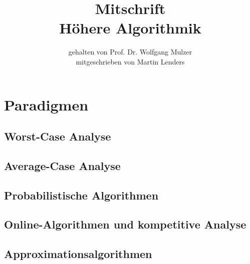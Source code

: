 \documentclass[a4paper,10pt]{scrbook}
\title{Mitschrift\\{\LARGE Höhere Algorithmik}}
\author{gehalten von Prof. Dr. Wolfgang Mulzer \\ mitgeschrieben von Martin Lenders}
\begin{document}
\maketitle
\tableofcontents




























\chapter{Paradigmen}
\section{Worst-Case Analyse}
\section{Average-Case Analyse}
\section{Probabilistische Algorithmen}
\section{Online-Algorithmen und kompetitive Analyse}
\section{Approximationsalgorithmen}
\end{document}
